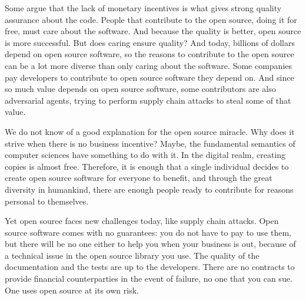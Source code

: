 Some argue that the lack of monetary incentives is what gives strong quality assurance about the code.
People that contribute to the open source, doing it for free, must care about the software.
And because the quality is better, open source is more successful.
But does caring ensure quality?
And today, billions of dollars depend on open source software, so the reasons to contribute to the open source can be a lot more diverse than only caring about the software.
Some companies pay developers to contribute to open source software they depend on.
And since so much value depends on open source software, some contributors are also adversarial agents, trying to perform supply chain attacks to steal some of that value.

We do not know of a good explanation for the open source miracle.
Why does it strive when there is no business incentive?
Maybe, the fundamental semantics of computer sciences have something to do with it.
In the digital realm, creating copies is almost free.
Therefore, it is enough that a single individual decides to create open source software for everyone to benefit, and through the great diversity in humankind, there are enough people ready to contribute for reasons personal to themselves.

Yet open source faces new challenges today, like supply chain attacks.
Open source software comes with no guarantees: you do not have to pay to use them, but there will be no one either to help you when your business is out, because of a technical issue in the open source library you use.
The quality of the documentation and the tests are up to the developers.
There are no contracts to provide financial counterparties in the event of failure, no one that you can sue.
One uses open source at its own risk.

